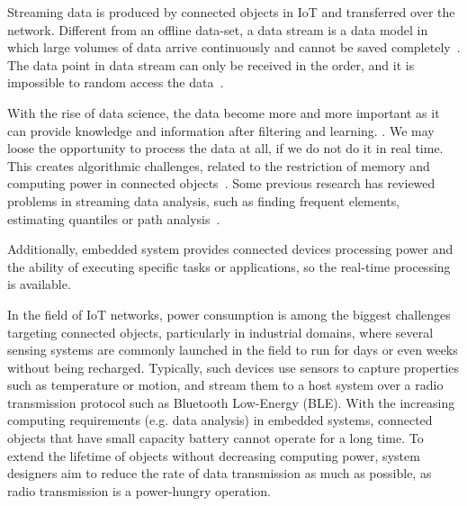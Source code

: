Streaming data is produced by connected objects in IoT and transferred over
the network. Different from an offline data-set, a data stream is a data
model in which large volumes of data arrive continuously and cannot be
saved completely~\cite{o2002streaming}. The data point in data stream can
only be received in the order, and it is impossible to random access the
data~\cite{o2002streaming}.

With the rise of data science, the data become more and more important as it
can provide knowledge and information after filtering and learning. . We may loose the
opportunity to process the data at all, if we do not do it in real time.
This creates algorithmic challenges, related to the restriction of memory
and computing power in connected objects~\cite{o2002streaming}. Some
previous research has reviewed problems in streaming data analysis, such as
finding frequent elements, estimating quantiles or path analysis~\cite{kejariwal2015real}. 

Additionally, embedded system provides connected devices processing power and
the ability of executing specific tasks or applications, so the real-time
processing is available. 


In the field of IoT networks, power consumption is among the biggest challenges
targeting connected objects, particularly in industrial domains, where
several sensing systems are commonly launched in the field to run for days or
even weeks without being recharged. Typically, such devices use sensors to
capture properties such as temperature or motion, and stream them to a host
system over a radio transmission protocol such as Bluetooth Low-Energy (BLE).
With the increasing computing requirements (e.g. data analysis) in embedded
systems, connected objects that have small capacity
battery cannot operate for a long time. To extend the lifetime of objects without
decreasing computing power, system designers aim to reduce the rate of data
transmission as much as possible, as radio transmission is a power-hungry
operation.

